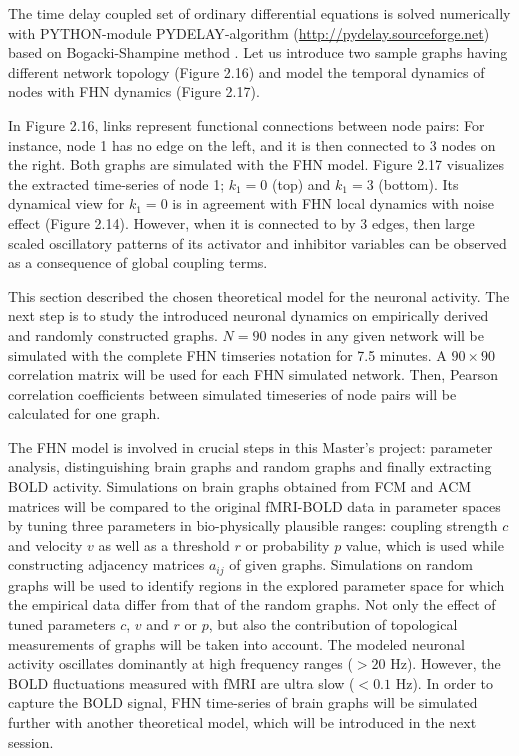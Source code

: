 The time delay coupled set of ordinary differential equations is solved numerically with \textsc{PYTHON}-module \textsc{PYDELAY}-algorithm (\url{http://pydelay.sourceforge.net}) based on Bogacki-Shampine method \citep{FLU09a, BOG89}. Let us introduce two sample graphs having different network topology (Figure 2.16) and model the temporal dynamics of nodes with FHN dynamics (Figure 2.17).

In Figure 2.16, links represent functional connections between node pairs: For instance, node 1 has no edge on the left, and it is then connected to 3 nodes on the right. Both graphs are simulated with the FHN model. Figure 2.17 visualizes the extracted time-series of node 1; $k_1=0$ (top) and $k_1=3$ (bottom). Its dynamical view for $k_1=0$ is in agreement with FHN local dynamics with noise effect (Figure 2.14). However, when it is connected to by 3 edges, then large scaled oscillatory patterns of its activator and inhibitor variables can be observed as a consequence of global coupling terms. 
  
This section described the chosen theoretical model for the neuronal activity. The next step is to study the introduced neuronal dynamics on empirically derived and randomly constructed graphs. $N=90$ nodes  in any given network will be simulated with the complete FHN timseries notation for 7.5 minutes. A $90\times 90$ correlation matrix will be used for each FHN simulated network. Then, Pearson correlation coefficients between simulated timeseries of node pairs will be calculated for one graph. 

The FHN model is involved in crucial steps in this Master's project: parameter analysis, distinguishing brain graphs and random graphs and finally extracting BOLD activity. Simulations on brain graphs obtained from FCM and ACM matrices will be compared to the original fMRI-BOLD data in parameter spaces by tuning three parameters in bio-physically plausible ranges: coupling strength $c$ and velocity $v$ as well as a threshold $r$ or probability $p$ value, which is used while constructing adjacency matrices $a_{ij}$ of given graphs. Simulations on random graphs will be used to identify regions in the explored parameter space for which the empirical data differ from that of the random graphs. Not only the effect of tuned parameters $c$, $v$ and $r$ or $p$, but also the contribution of topological measurements of graphs will be taken into account. The modeled neuronal activity oscillates dominantly at high frequency ranges ($> 20$ Hz). However, the BOLD fluctuations measured with fMRI are ultra slow ($<0.1$ Hz). In order to  capture the BOLD signal, FHN time-series of brain graphs will be simulated further with another theoretical model, which will be introduced in the next session.   



